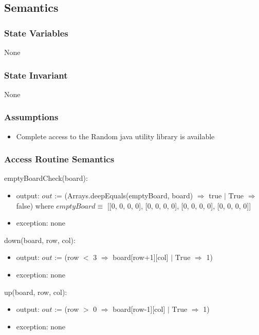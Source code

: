 \documentclass[12pt]{article}
\begin{document}
\subsection* {Semantics}

\subsubsection* {State Variables}

None

\subsubsection* {State Invariant}

None

\subsubsection* {Assumptions}
\begin{itemize}
  \item Complete access to the Random java utility library is available
\end{itemize}

\subsubsection* {Access Routine Semantics}

\noindent emptyBoardCheck(board):
\begin{itemize}
\item output: $out$ := (Arrays.deepEquals(emptyBoard, board) $\Rightarrow$  true $|$ $\text{True}$ $\Rightarrow$ false)
\newline where $\mathit{emptyBoard} \equiv$ [[0, 0, 0, 0], [0, 0, 0, 0], [0, 0, 0, 0], [0, 0, 0, 0]]
\item exception: none
\end{itemize}

\noindent down(board, row, col):
\begin{itemize}
\item output: $out$ := (row $<$ 3 $\Rightarrow$  board[row+1][col] $|$ $\text{True}$ $\Rightarrow$ 1)
\item exception: none
\end{itemize}

\noindent up(board, row, col):
\begin{itemize}
\item output: $out$ := (row $>$ 0 $\Rightarrow$  board[row-1][col] $|$ $\text{True}$ $\Rightarrow$ 1)
\item exception: none
\end{itemize}
\end{document}
